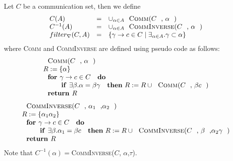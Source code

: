 \documentclass{article}
\begin{document}
Let $C$ be a communication set, then we define%
\[
\begin{array}{lll}
C(A) & = & \cup _{\alpha \in A}\text{\textsc{Comm}(}C\text{, }\alpha \text{)}
\\
C^{-1}(A) & = & \cup _{\alpha \in A}\text{\textsc{CommInverse}(}C\text{, }%
\alpha \text{)} \\
filter_{\nabla }(C,A) & = & \{\gamma \rightarrow c\in C\mid \exists _{\alpha
\in A}.\gamma \subset \alpha \}%
\end{array}%
\]%
where \textsc{Comm} and \textsc{CommInverse} are defined using pseudo code
as follows:%
\[
\begin{array}{l}
\text{\textsc{Comm}(}C\text{, }\alpha \text{)} \\
R:=\{\alpha \} \\
\text{\textbf{for }}\gamma \rightarrow c\in C\text{ \textbf{do}} \\
\qquad \text{\textbf{if }}\exists \beta .\alpha =\beta \gamma \text{ \textbf{%
then} }R:=R\cup \text{\textsc{Comm}(}C\text{, }\beta c\text{)} \\
\text{\textbf{return }}R%
\end{array}%
\]%
\[
\begin{array}{l}
\text{\textsc{CommInverse}(}C\text{, }\alpha _{1}\text{,}\alpha _{2}\text{)}
\\
R:=\{\alpha _{1}\alpha _{2}\} \\
\text{\textbf{for }}\gamma \rightarrow c\in C\text{ \textbf{do}} \\
\qquad \text{\textbf{if }}\exists \beta .\alpha _{1}=\beta c\text{ \textbf{%
then} }R:=R\cup \text{\textsc{CommInverse}(}C\text{, }\beta \text{,}\alpha
_{2}\gamma \text{)} \\
\text{\textbf{return }}R%
\end{array}%
\]%
Note that $C^{-1}(\alpha )=$\textsc{CommInverse}($C$, $\alpha $,$\tau $).
\end{document}

